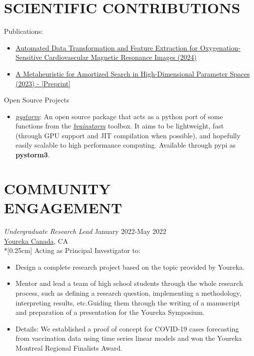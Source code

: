 \documentclass[margin, 10pt]{res} %
\begin{document}
\begin{resume}
		\section{SCIENTIFIC CONTRIBUTIONS}
		Publications:
		\begin{itemize}\itemsep -2pt %
			\item \href{https://link.springer.com/article/10.1007/s12265-023-10474-7}{Automated Data Transformation and Feature Extraction for Oxygenation-Sensitive Cardiovascular Magnetic Resonance Images (2024) }
			\item \href{https://arxiv.org/abs/2309.16465}{A Metaheuristic for Amortized Search in High-Dimensional Parameter Spaces (2023) - [Preprint]}
		\end{itemize}
		Open Source Projects
		\vspace*{0.15cm}
		\begin{itemize}\itemsep -2pt %
			\item \href{https://github.com/NeuroLife77/pystorm}{\textit{pystorm}}: An open source package that acts as a python port of some functions from the \href{https://neuroimage.usc.edu/brainstorm/}{\textit{brainstorm}} toolbox. It aims to be lightweight, fast (through GPU support and JIT compilation when possible), and hopefully easily scalable to high performance computing. Available through pypi as \textbf{pystorm3}.
		\end{itemize}
	
		
		\section{COMMUNITY \\ ENGAGEMENT}
		{\sl Undergraduate Research Lead} \hfill January 2022-May 2022\\ \href{https://yourekacanada.org/}{Youreka Canada}, CA\\*[0.25cm] 
		Acting as Principal Investigator to:
		\vspace*{0.15cm}
		\begin{itemize}\itemsep -2pt %
			\item Design a complete research project based on the topic provided by Youreka.
			\item Mentor and lead a team of high school students through the whole research process, such as defining a research question, implementing a methodology, interpreting results, etc.Guiding them through the writing of a manuscript and preparation of a presentation for the Youreka Symposium.
			\item[\ding{71}] Details: We established a proof of concept for COVID-19 cases forecasting from vaccination data using time series linear models and won the Youreka Montreal Regional Finalists Award.
		\end{itemize}
		

\end{resume}
\end{document}
